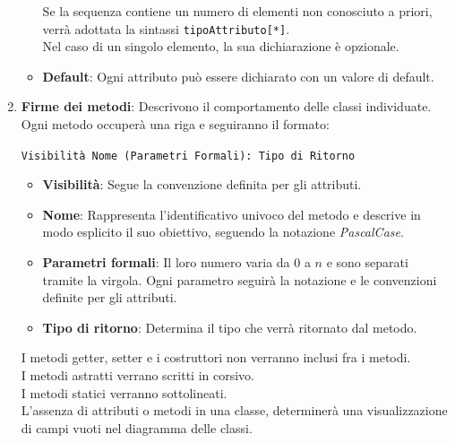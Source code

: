 \begin{enumerate}
\begin{itemize}
        Se la sequenza contiene un numero di elementi non conosciuto a priori, verrà adottata la sintassi \texttt{tipoAttributo[*]}. \\
        Nel caso di un singolo elemento, la sua dichiarazione è opzionale.
        \item \textbf{Default}: Ogni attributo può essere dichiarato con un valore di default.
    \end{itemize}
    \item \textbf{Firme dei metodi}: Descrivono il comportamento delle classi individuate. Ogni metodo occuperà una riga e seguiranno il formato: \\
    \begin{center} \texttt{Visibilità Nome (Parametri Formali): Tipo di Ritorno} \end{center}
    \begin{itemize}
        \item \textbf{Visibilità}: Segue la convenzione definita per gli attributi.
        \item \textbf{Nome}: Rappresenta l'identificativo univoco del metodo e descrive in modo esplicito il suo obiettivo, seguendo la notazione \textit{PascalCase}.
        \item \textbf{Parametri formali}: Il loro numero varia da $0$ a $n$ e sono separati tramite la virgola. Ogni parametro seguirà la notazione e le convenzioni definite per gli attributi.
        \item \textbf{Tipo di ritorno}: Determina il tipo che verrà ritornato dal metodo.
    \end{itemize}
    I metodi getter, setter e i costruttori non verranno inclusi fra i metodi. \\
    I metodi astratti verrano scritti in corsivo. \\
    I metodi statici verranno sottolineati. \\
    L'assenza di attributi o metodi in una classe, determinerà una visualizzazione di campi vuoti nel diagramma delle classi.
\end{enumerate}

